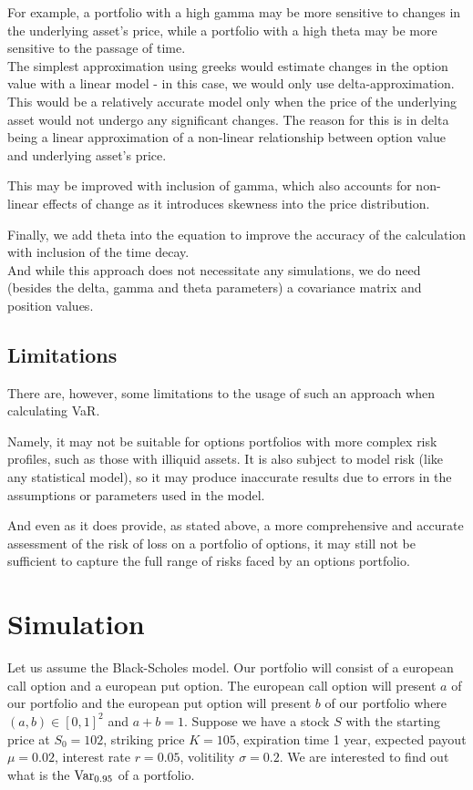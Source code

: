 \documentclass[a4paper, 12pt]{article}
\theoremstyle{definition}
\theoremstyle{plain}
\theoremstyle{definition}
\begin{document}
For example, a portfolio with a high gamma may be 
more sensitive to changes in the 
underlying asset's price, 
while a portfolio with a high theta 
may be more sensitive to the passage 
of time.\\


The simplest approximation using greeks would estimate changes 
in the option value with a linear model - in this case, we would 
only use delta-approximation. This would be a relatively accurate 
model only when the price of the underlying asset would not undergo any 
significant changes. The reason for this is in delta being a linear 
approximation of a non-linear relationship between option value and underlying 
asset's price. 

This may be improved with inclusion of gamma, which also accounts for 
non-linear effects of change as it introduces skewness into the price distribution.


Finally, we add theta into the equation to improve the accuracy of the calculation 
with inclusion of the time decay.\\

And while this approach does not necessitate any simulations,
we do need (besides the delta, gamma and theta 
parameters) a covariance matrix and position values. 



\subsection{Limitations}

There are, however, some limitations to the usage of such an approach
when calculating VaR. 

Namely, it may not be suitable for options portfolios with more complex 
risk profiles, such as those with illiquid assets. 
It is also subject to model risk (like any statistical model),
so it may produce inaccurate results due to errors in the 
assumptions or parameters used in the model.

And even as it does provide, as stated above, 
a more comprehensive and accurate assessment of the risk 
of loss on a portfolio of options, it may still not be 
sufficient to capture the full range of risks faced by 
an options portfolio.

\section{Simulation}

Let us assume the Black-Scholes model.
Our portfolio will consist of a european 
call option and a european put option.
The european call option will present 
$a$ of our portfolio and the  european put option
will present $b$ of our portfolio 
where $(a,b) \in [0,1]^2$ and $a+b=1$.
Suppose we have a stock $S$ with the starting price 
at $S_0 = 102$, striking price $K=105$, expiration time 
1 year, expected payout $\mu = 0.02$, interest rate
$r = 0.05$, volitility $\sigma = 0.2$.
We are interested to find out what is the 
$\textnormal{Var}_{0.95}$ of a portfolio.
\end{document}
